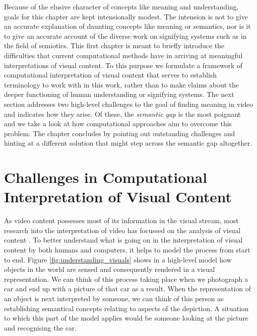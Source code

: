Because of the elusive character of concepts like meaning and understanding, goals for this chapter are kept intensionally modest. The intension is not to give an accurate explanation of daunting concepts like meaning or semantics, nor is it to give an accurate account of the diverse work on signifying systems such as in the field of semiotics. This first chapter is meant to briefly introduce the difficulties that current computational methods have in arriving at meaningful interpretations of visual content. To this purpose we formulate a framework of computational interpretation of visual content that serves to establish terminology to work with in this work, rather than to make claims about the deeper functioning of human understanding or signifying systems. The next section addresses two high-level challenges to the goal of finding meaning in video and indicates how they arise. Of these, the \emph{semantic gap} is the most poignant and we take a look at how computational approaches aim to overcome this problem. The chapter concludes by pointing out outstanding challenges and hinting at a different solution that might step across the semantic gap altogether.


\section{Challenges in Computational Interpretation of Visual Content} %
\label{sec:challenges_in_interpretation}

As video content possesses most of its information in the visual stream, most research into the interpretation of video has focussed on the analysis of visual content \cite[ch.~2]{Snoek:2009dq}. To better understand what is going on in the interpretation of visual content by both humans and computers, it helps to model the process from start to end. Figure \ref{fig:understanding_visuals} shows in a high-level model how objects in the world are sensed and consequently rendered in a visual representation. We can think of this process taking place when we photograph a car and end up with a picture of that car as a result. When the representation of an object is next interpreted by someone, we can think of this person as establishing semantical concepts relating to aspects of the depiction. A situation to which this part of the model applies would be someone looking at the picture and recognising the car.

